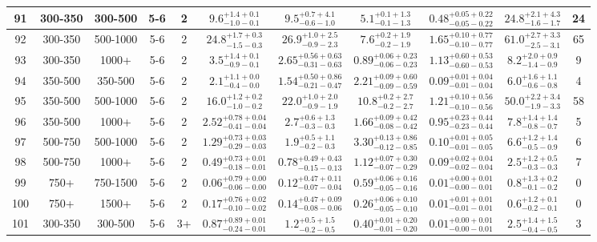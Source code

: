 \documentclass[11pt, oneside]{article}
\begin{document}
\begin{table}
{\begin{tabular}{ |c|c|c|c|c||c|c|c|c||c|c| }
91 & 300-350 & 300-500 & 5-6 & 2 & $9.6^{+1.4+0.1}_{-1.0-0.1}$ & $9.5^{+0.7+4.1}_{-0.6-1.0}$ & $5.1^{+0.1+1.3}_{-0.1-1.3}$ & $0.48^{+0.05+0.22}_{-0.05-0.22}$ & $24.8^{+2.1+4.3}_{-1.6-1.7}$ & 24 \\ \hline
92 & 300-350 & 500-1000 & 5-6 & 2 & $24.8^{+1.7+0.3}_{-1.5-0.3}$ & $26.9^{+1.0+2.5}_{-0.9-2.3}$ & $7.6^{+0.2+1.9}_{-0.2-1.9}$ & $1.65^{+0.10+0.77}_{-0.10-0.77}$ & $61.0^{+2.7+3.3}_{-2.5-3.1}$ & 65 \\ \hline
93 & 300-350 & 1000+ & 5-6 & 2 & $3.5^{+1.4+0.1}_{-0.9-0.1}$ & $2.65^{+0.56+0.63}_{-0.31-0.63}$ & $0.89^{+0.06+0.23}_{-0.06-0.23}$ & $1.13^{+0.60+0.53}_{-0.60-0.53}$ & $8.2^{+2.0+0.9}_{-1.4-0.9}$ & 9 \\ \hline
94 & 350-500 & 350-500 & 5-6 & 2 & $2.1^{+1.1+0.0}_{-0.4-0.0}$ & $1.54^{+0.50+0.86}_{-0.21-0.47}$ & $2.21^{+0.09+0.60}_{-0.09-0.59}$ & $0.09^{+0.01+0.04}_{-0.01-0.04}$ & $6.0^{+1.6+1.1}_{-0.6-0.8}$ & 4 \\ \hline
95 & 350-500 & 500-1000 & 5-6 & 2 & $16.0^{+1.2+0.2}_{-1.0-0.2}$ & $22.0^{+1.0+2.0}_{-0.9-1.9}$ & $10.8^{+0.2+2.7}_{-0.2-2.7}$ & $1.21^{+0.10+0.56}_{-0.10-0.56}$ & $50.0^{+2.2+3.4}_{-1.9-3.3}$ & 58 \\ \hline
96 & 350-500 & 1000+ & 5-6 & 2 & $2.52^{+0.78+0.04}_{-0.41-0.04}$ & $2.7^{+0.6+1.3}_{-0.3-0.3}$ & $1.66^{+0.09+0.42}_{-0.08-0.42}$ & $0.95^{+0.23+0.44}_{-0.23-0.44}$ & $7.8^{+1.4+1.4}_{-0.8-0.7}$ & 5 \\ \hline
97 & 500-750 & 500-1000 & 5-6 & 2 & $1.29^{+0.73+0.03}_{-0.29-0.03}$ & $1.9^{+0.5+1.1}_{-0.2-0.3}$ & $3.30^{+0.13+0.86}_{-0.12-0.85}$ & $0.10^{+0.01+0.05}_{-0.01-0.05}$ & $6.6^{+1.2+1.4}_{-0.5-0.9}$ & 6 \\ \hline
98 & 500-750 & 1000+ & 5-6 & 2 & $0.49^{+0.73+0.01}_{-0.18-0.01}$ & $0.78^{+0.49+0.43}_{-0.15-0.13}$ & $1.12^{+0.07+0.30}_{-0.07-0.29}$ & $0.09^{+0.02+0.04}_{-0.02-0.04}$ & $2.5^{+1.2+0.5}_{-0.3-0.3}$ & 7 \\ \hline
99 & 750+ & 750-1500 & 5-6 & 2 & $0.06^{+0.79+0.00}_{-0.06-0.00}$ & $0.12^{+0.47+0.11}_{-0.07-0.04}$ & $0.59^{+0.06+0.16}_{-0.05-0.16}$ & $0.01^{+0.00+0.01}_{-0.00-0.01}$ & $0.8^{+1.3+0.2}_{-0.1-0.2}$ & 0 \\ \hline
100 & 750+ & 1500+ & 5-6 & 2 & $0.17^{+0.76+0.02}_{-0.10-0.02}$ & $0.14^{+0.47+0.09}_{-0.08-0.06}$ & $0.26^{+0.06+0.10}_{-0.05-0.10}$ & $0.01^{+0.01+0.01}_{-0.01-0.01}$ & $0.6^{+1.2+0.1}_{-0.2-0.1}$ & 0 \\ \hline
101 & 300-350 & 300-500 & 5-6 & 3+ & $0.87^{+0.89+0.01}_{-0.24-0.01}$ & $1.2^{+0.5+1.5}_{-0.2-0.5}$ & $0.40^{+0.01+0.20}_{-0.01-0.20}$ & $0.01^{+0.00+0.01}_{-0.00-0.01}$ & $2.5^{+1.4+1.5}_{-0.4-0.5}$ & 3 \\ \hline

\end{tabular}}
\end{table}
\end{document}
